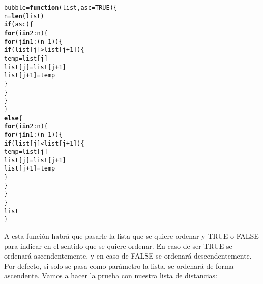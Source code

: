 \documentclass[12pt]{report}\usepackage[]{graphicx}\usepackage[dvipsnames]{xcolor}
\makeatletter
\newcommand{\hlnum}[1]{\textcolor[rgb]{0.686,0.059,0.569}{#1}}%
\newcommand{\hlopt}[1]{\textcolor[rgb]{0,0,0}{#1}}%
\newcommand{\hlstd}[1]{\textcolor[rgb]{0.345,0.345,0.345}{#1}}%
\newcommand{\hlkwa}[1]{\textcolor[rgb]{0.161,0.373,0.58}{\textbf{#1}}}%
\newcommand{\hlkwb}[1]{\textcolor[rgb]{0.69,0.353,0.396}{#1}}%
\newcommand{\hlkwc}[1]{\textcolor[rgb]{0.333,0.667,0.333}{#1}}%
\newcommand{\hlkwd}[1]{\textcolor[rgb]{0.737,0.353,0.396}{\textbf{#1}}}%
\newenvironment{kframe}{%
 \def\at@end@of@kframe{}%
 \ifinner\ifhmode%
  \def\at@end@of@kframe{\end{minipage}}%
  \begin{minipage}{\columnwidth}%
 \fi\fi%
 \def\FrameCommand##1{\hskip\@totalleftmargin \hskip-\fboxsep
 \colorbox{shadecolor}{##1}\hskip-\fboxsep
     \hskip-\linewidth \hskip-\@totalleftmargin \hskip\columnwidth}%
 \MakeFramed {\advance\hsize-\width
   \@totalleftmargin\z@ \linewidth\hsize
   \@setminipage}}%
 {\par\unskip\endMakeFramed%
 \at@end@of@kframe}
\newenvironment{knitrout}{}{} %
\makeatother
\begin{document}
\begin{knitrout}
\color{fgcolor}\begin{kframe}
\begin{alltt}
\hlstd{bubble} \hlkwb{=} \hlkwa{function}\hlstd{(}\hlkwc{list}\hlstd{,} \hlkwc{asc} \hlstd{=} \hlnum{TRUE}\hlstd{)\{}
        \hlstd{n} \hlkwb{=} \hlkwd{len}\hlstd{(list)}
        \hlkwa{if}\hlstd{(asc)\{}
                \hlkwa{for} \hlstd{(i} \hlkwa{in} \hlnum{2}\hlopt{:}\hlstd{n)\{}
                        \hlkwa{for} \hlstd{(j} \hlkwa{in} \hlnum{1}\hlopt{:}\hlstd{(n}\hlopt{-}\hlnum{1}\hlstd{))\{}
                                \hlkwa{if} \hlstd{(list[j]} \hlopt{>} \hlstd{list[j}\hlopt{+}\hlnum{1}\hlstd{])\{}
                                        \hlstd{temp} \hlkwb{=} \hlstd{list[j]}
                                        \hlstd{list[j]} \hlkwb{=} \hlstd{list[j}\hlopt{+}\hlnum{1}\hlstd{]}
                                        \hlstd{list[j}\hlopt{+}\hlnum{1}\hlstd{]} \hlkwb{=} \hlstd{temp}
                                \hlstd{\}}
                        \hlstd{\}}
                \hlstd{\}}
        \hlstd{\}}
        \hlkwa{else} \hlstd{\{}
                \hlkwa{for} \hlstd{(i} \hlkwa{in} \hlnum{2}\hlopt{:}\hlstd{n)\{}
                        \hlkwa{for} \hlstd{(j} \hlkwa{in} \hlnum{1}\hlopt{:}\hlstd{(n}\hlopt{-}\hlnum{1}\hlstd{))\{}
                                \hlkwa{if} \hlstd{(list[j]} \hlopt{<} \hlstd{list[j}\hlopt{+}\hlnum{1}\hlstd{])\{}
                                        \hlstd{temp} \hlkwb{=} \hlstd{list[j]}
                                        \hlstd{list[j]} \hlkwb{=} \hlstd{list[j}\hlopt{+}\hlnum{1}\hlstd{]}
                                        \hlstd{list[j}\hlopt{+}\hlnum{1}\hlstd{]} \hlkwb{=} \hlstd{temp}
                                \hlstd{\}}
                        \hlstd{\}}
                \hlstd{\}}
        \hlstd{\}}
        \hlstd{list}
\hlstd{\}}
\end{alltt}
\end{kframe}
\end{knitrout}
			
			A esta función habrá que pasarle la lista que se quiere ordenar y TRUE o FALSE para indicar en el sentido que se quiere ordenar. En caso de ser TRUE se ordenará ascendentemente, y en caso de FALSE se ordenará descendentemente. Por defecto, si solo se pasa como parámetro la lista, se ordenará de forma ascendente. Vamos a hacer la prueba con nuestra lista de distancias:
			
\end{document}
